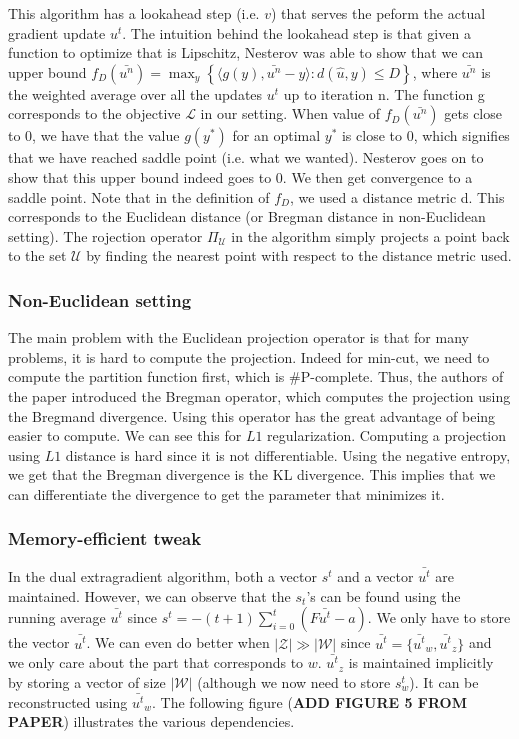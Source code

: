 This algorithm has a lookahead step (i.e. $v$) that serves the peform the actual
gradient update $u^t$. The intuition behind the lookahead step is that given a
function to optimize that is Lipschitz, Nesterov was able to show that we can
upper bound $f_{D}(\bar{u^n}) = \max_y \left \{ \langle g(y),\bar{u^n} - y
\rangle : d(\hat{u},y) \leq D \right \}$, where $\bar{u^n}$ is the weighted
average over all the updates $u^t$ up to iteration n. The function g corresponds
to the objective $\mathcal{L}$ in our setting. When value of $f_D(\bar{u^n})$
gets close to 0, we have that the value $g(y^*)$ for an optimal $y^*$ is close
to 0, which signifies that we have reached saddle point (i.e. what we wanted).
Nesterov goes on to show that this upper bound indeed goes to 0. We then get
convergence to a saddle point. Note that in the definition of $f_D$, we used a
distance metric d. This corresponds to the Euclidean distance (or Bregman
distance in non-Euclidean setting). The rojection operator $\Pi_{\mathcal{U}}$
in the algorithm simply projects a point back to the set $\mathcal{U}$ by
finding the nearest point with respect to the distance metric used.


\subsubsection{Non-Euclidean setting}
The main problem with the Euclidean projection operator is that for many
problems, it is hard to compute the projection. Indeed for min-cut, we need to
compute the partition function first, which is \#P-complete. Thus, the authors
of the paper introduced the Bregman operator, which computes the projection
using the Bregmand divergence. Using this operator has the great advantage of
being easier to compute. We can see this for $L1$ regularization. Computing a
projection using $L1$ distance is hard since it is not differentiable. Using the
negative entropy, we get that the Bregman divergence is the KL divergence. This
implies that we can differentiate the divergence to get the parameter that
minimizes it.

\subsubsection{Memory-efficient tweak}
In the dual extragradient algorithm, both a vector $s^t$ and a vector
$\bar{u^t}$ are maintained. However, we can observe that the $s_t$'s can be
found using the running average $\bar{u^t}$ since $s^t = -(t + 1 ) \sum_{i=0}^t
(F \bar{u^t} - a)$. We only have to store the vector $\bar{u^t}$. We can even do
better when $|\mathcal{Z}| \gg |\mathcal{W}|$ since $\bar{u^t} = \{
\bar{u^t}_w,\bar{u^t}_z \}$ and we only care about the part that corresponds to
$w$. $\bar{u^t}_z$ is maintained implicitly by storing a vector of size
$|\mathcal{W}|$ (although we now need to store $s_w^t$). It can be reconstructed
using $\bar{u^t}_w$. The following figure (\textbf{ADD FIGURE 5 FROM PAPER})
illustrates the various dependencies.

